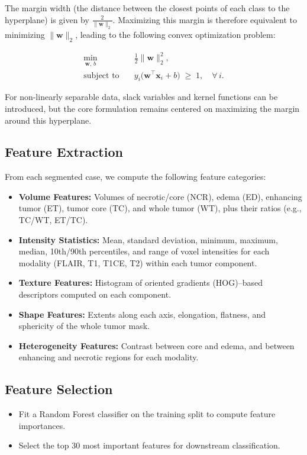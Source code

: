 The margin width (the distance between the closest points of each class to the hyperplane) is given by $\tfrac{2}{\|\mathbf{w}\|_2}$.  Maximizing this margin is therefore equivalent to minimizing $\|\mathbf{w}\|_2$, leading to the following convex optimization problem:

\begin{align}
  \min_{\mathbf{w},\,b} \quad & \frac{1}{2} \|\mathbf{w}\|_2^2,                             \\
  \text{subject to} \quad     & y_i \bigl(\mathbf{w}^\top \mathbf{x}_i + b\bigr) \;\ge\; 1,
  \quad \forall\,i.
\end{align}

For non-linearly separable data, slack variables and kernel functions can be introduced, but the core formulation remains centered on maximizing the margin around this hyperplane.

\subsection{Feature Extraction}
From each segmented case, we compute the following feature categories:
\begin{itemize}
  \item \textbf{Volume Features:} Volumes of necrotic/core (NCR), edema (ED), enhancing tumor (ET), tumor core (TC), and whole tumor (WT), plus their ratios (e.g., TC/WT, ET/TC).
  \item \textbf{Intensity Statistics:} Mean, standard deviation, minimum, maximum, median, 10th/90th percentiles, and range of voxel intensities for each modality (FLAIR, T1, T1CE, T2) within each tumor component.
  \item \textbf{Texture Features:} Histogram of oriented gradients (HOG)–based descriptors computed on each component.
  \item \textbf{Shape Features:} Extents along each axis, elongation, flatness, and sphericity of the whole tumor mask.
  \item \textbf{Heterogeneity Features:} Contrast between core and edema, and between enhancing and necrotic regions for each modality.
\end{itemize}

\subsection{Feature Selection}
\begin{itemize}
  \item Fit a Random Forest classifier on the training split to compute feature importances.
  \item Select the top 30 most important features for downstream classification.
\end{itemize}

